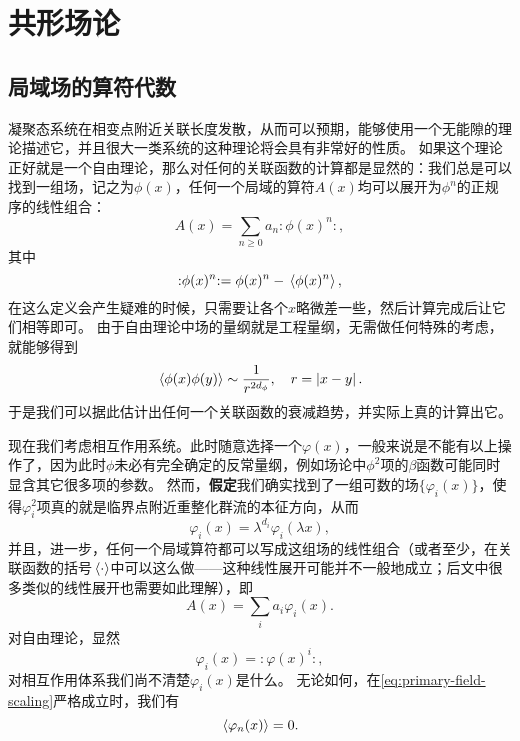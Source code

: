 \documentclass[hyperref, UTF8, a4paper]{ctexart}
\newcommand{\normord}[1]{\vcentcolon\mathrel{#1}\vcentcolon}
\providecommand{\vcentcolon}{\mathrel{\mathop{:}}}
\renewcommand{\emph}{\textbf}
\begin{document}
\section{共形场论}

\subsection{局域场的算符代数}

凝聚态系统在相变点附近关联长度发散，从而可以预期，能够使用一个无能隙的理论描述它，并且很大一类系统的这种理论将会具有非常好的性质。
如果这个理论正好就是一个自由理论，那么对任何的关联函数的计算都是显然的：我们总是可以找到一组场，记之为$\phi(x)$，任何一个局域的算符$A(x)$均可以展开为$\phi^n$的正规序的线性组合：
\begin{equation}
    A(x) = \sum_{n \geq 0} a_n \normord{\phi(x)^n},
\end{equation}
其中
\[
    \normord{\phi(x)^n} = \phi(x)^n - \expval*{\phi(x)^n},
\]
在这么定义会产生疑难的时候，只需要让各个$x$略微差一些，然后计算完成后让它们相等即可。
由于自由理论中场的量纲就是工程量纲，无需做任何特殊的考虑，就能够得到
\begin{equation}
    \expval*{\phi(x) \phi(y)} \sim \frac{1}{r^{2 d_\phi}}, \quad r = \abs*{x - y}.
\end{equation}
于是我们可以据此估计出任何一个关联函数的衰减趋势，并实际上真的计算出它。

现在我们考虑相互作用系统。此时随意选择一个$\varphi(x)$，一般来说是不能有以上操作了，因为此时$\phi$未必有完全确定的反常量纲，例如场论中$\phi^2$项的$\beta$函数可能同时显含其它很多项的参数。
然而，\emph{假定}我们确实找到了一组可数的场$\{\varphi_i(x)\}$，使得$\varphi_i^2$项真的就是临界点附近重整化群流的本征方向，从而
\begin{equation}
    \varphi_i(x) = \lambda^{d_i} \varphi_i(\lambda x),
    \label{eq:primary-field-scaling}
\end{equation}
并且，进一步，任何一个局域算符都可以写成这组场的线性组合（或者至少，在关联函数的括号$\expval*{\cdot}$中可以这么做——这种线性展开可能并不一般地成立；后文中很多类似的线性展开也需要如此理解），即
\begin{equation}
    A(x) = \sum_{i} a_i \varphi_i(x).
\end{equation}
对自由理论，显然
\begin{equation}
    \varphi_i(x) = \normord{\varphi(x)^i},
\end{equation}
对相互作用体系我们尚不清楚$\varphi_i(x)$是什么。
无论如何，在\eqref{eq:primary-field-scaling}严格成立时，我们有
\begin{equation}
    \expval*{\varphi_n(x)} = 0.
\end{equation}
\end{document}
